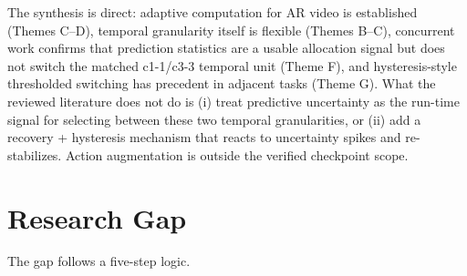 \documentclass[11pt,a4paper]{article}
\begin{document}
The synthesis is direct: adaptive computation for AR video is established (Themes C--D), temporal granularity itself is flexible (Themes B--C), concurrent work confirms that prediction statistics are a usable allocation signal but does not switch the matched c1-1/c3-3 temporal unit (Theme F), and hysteresis-style thresholded switching has precedent in adjacent tasks (Theme G). What the reviewed literature does not do is (i) treat predictive uncertainty as the run-time signal for selecting between these two temporal granularities, or (ii) add a recovery + hysteresis mechanism that reacts to uncertainty spikes and re-stabilizes. Action augmentation is outside the verified checkpoint scope.

\section{Research Gap}\label{sec:gap}

The gap follows a five-step logic.
\end{document}
